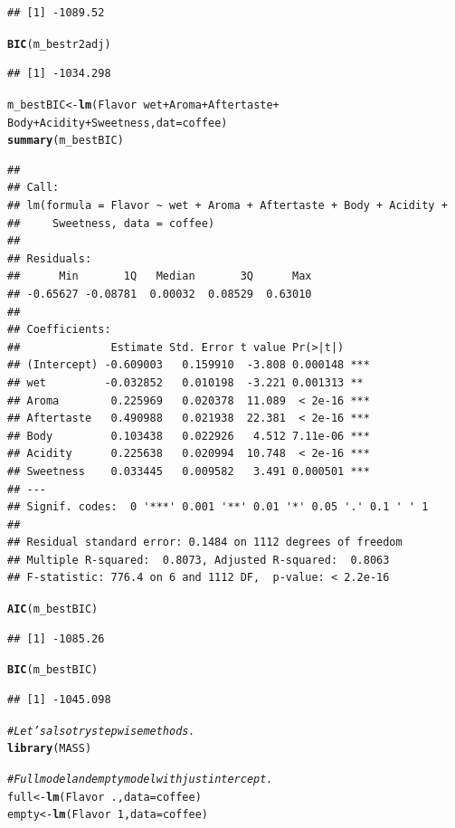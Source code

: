\documentclass[oneside]{book}\usepackage[]{graphicx}\usepackage[dvipsnames,table,xcdraw]{xcolor}
\makeatletter
\newcommand{\hlnum}[1]{\textcolor[rgb]{0.686,0.059,0.569}{#1}}%
\newcommand{\hlcom}[1]{\textcolor[rgb]{0.678,0.584,0.686}{\textit{#1}}}%
\newcommand{\hlopt}[1]{\textcolor[rgb]{0,0,0}{#1}}%
\newcommand{\hlstd}[1]{\textcolor[rgb]{0.345,0.345,0.345}{#1}}%
\newcommand{\hlkwb}[1]{\textcolor[rgb]{0.69,0.353,0.396}{#1}}%
\newcommand{\hlkwc}[1]{\textcolor[rgb]{0.333,0.667,0.333}{#1}}%
\newcommand{\hlkwd}[1]{\textcolor[rgb]{0.737,0.353,0.396}{\textbf{#1}}}%
\newenvironment{kframe}{%
 \def\at@end@of@kframe{}%
 \ifinner\ifhmode%
  \def\at@end@of@kframe{\end{minipage}}%
  \begin{minipage}{\columnwidth}%
 \fi\fi%
 \def\FrameCommand##1{\hskip\@totalleftmargin \hskip-\fboxsep
 \colorbox{shadecolor}{##1}\hskip-\fboxsep
     \hskip-\linewidth \hskip-\@totalleftmargin \hskip\columnwidth}%
 \MakeFramed {\advance\hsize-\width
   \@totalleftmargin\z@ \linewidth\hsize
   \@setminipage}}%
 {\par\unskip\endMakeFramed%
 \at@end@of@kframe}
\newenvironment{knitrout}{}{} %
\makeatother
\begin{document}
\begin{knitrout}
\begin{kframe}
\begin{verbatim}
## [1] -1089.52
\end{verbatim}
\begin{alltt}
\hlkwd{BIC}\hlstd{(m_bestr2adj)}
\end{alltt}
\begin{verbatim}
## [1] -1034.298
\end{verbatim}
\begin{alltt}
\hlstd{m_bestBIC} \hlkwb{<-} \hlkwd{lm}\hlstd{(Flavor} \hlopt{~} \hlstd{wet} \hlopt{+} \hlstd{Aroma} \hlopt{+} \hlstd{Aftertaste} \hlopt{+}
\hlstd{Body} \hlopt{+} \hlstd{Acidity} \hlopt{+} \hlstd{Sweetness ,} \hlkwc{dat} \hlstd{= coffee)}
\hlkwd{summary}\hlstd{(m_bestBIC)}
\end{alltt}
\begin{verbatim}
## 
## Call:
## lm(formula = Flavor ~ wet + Aroma + Aftertaste + Body + Acidity + 
##     Sweetness, data = coffee)
## 
## Residuals:
##      Min       1Q   Median       3Q      Max 
## -0.65627 -0.08781  0.00032  0.08529  0.63010 
## 
## Coefficients:
##              Estimate Std. Error t value Pr(>|t|)    
## (Intercept) -0.609003   0.159910  -3.808 0.000148 ***
## wet         -0.032852   0.010198  -3.221 0.001313 ** 
## Aroma        0.225969   0.020378  11.089  < 2e-16 ***
## Aftertaste   0.490988   0.021938  22.381  < 2e-16 ***
## Body         0.103438   0.022926   4.512 7.11e-06 ***
## Acidity      0.225638   0.020994  10.748  < 2e-16 ***
## Sweetness    0.033445   0.009582   3.491 0.000501 ***
## ---
## Signif. codes:  0 '***' 0.001 '**' 0.01 '*' 0.05 '.' 0.1 ' ' 1
## 
## Residual standard error: 0.1484 on 1112 degrees of freedom
## Multiple R-squared:  0.8073,	Adjusted R-squared:  0.8063 
## F-statistic: 776.4 on 6 and 1112 DF,  p-value: < 2.2e-16
\end{verbatim}
\begin{alltt}
\hlkwd{AIC}\hlstd{(m_bestBIC)}
\end{alltt}
\begin{verbatim}
## [1] -1085.26
\end{verbatim}
\begin{alltt}
\hlkwd{BIC}\hlstd{(m_bestBIC)}
\end{alltt}
\begin{verbatim}
## [1] -1045.098
\end{verbatim}
\begin{alltt}
\hlcom{# Let's also try stepwise methods.}
\hlkwd{library}\hlstd{(MASS)}

\hlcom{# Full model and empty model with just intercept.}
\hlstd{full} \hlkwb{<-} \hlkwd{lm}\hlstd{(Flavor} \hlopt{~} \hlstd{.,} \hlkwc{data} \hlstd{= coffee)}
\hlstd{empty} \hlkwb{<-} \hlkwd{lm}\hlstd{(Flavor} \hlopt{~} \hlnum{1}\hlstd{,} \hlkwc{data} \hlstd{= coffee)}


\end{alltt}
\end{kframe}
\end{knitrout}
\end{document}
